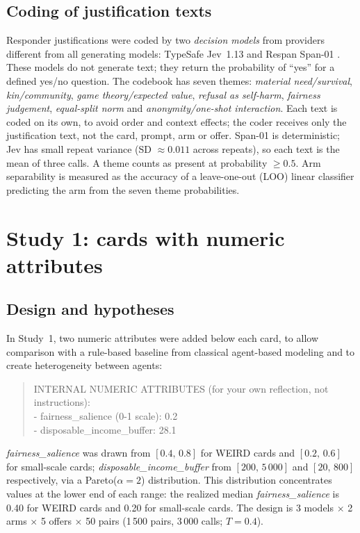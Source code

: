 \documentclass[11pt]{article}
\newcommand{\fairs}{\textit{fairness\_salience}}
\newcommand{\disp}{\textit{disposable\_income\_buffer}}
\begin{document}
\subsection{Coding of justification texts}

Responder justifications were coded by two \emph{decision models} from providers different from all generating models: TypeSafe Jev~1.13 \citep{typesafe2026jev} and Respan Span-01 \citep{respan2026span}. These models do not generate text; they return the probability of ``yes'' for a defined yes/no question. The codebook has seven themes: \emph{material need/survival}, \emph{kin/community}, \emph{game theory/expected value}, \emph{refusal as self-harm}, \emph{fairness judgement}, \emph{equal-split norm} and \emph{anonymity/one-shot interaction}. Each text is coded on its own, to avoid order and context effects; the coder receives only the justification text, not the card, prompt, arm or offer. Span-01 is deterministic; Jev has small repeat variance (SD $\approx 0.011$ across repeats), so each text is the mean of three calls. A theme counts as present at probability $\geq 0.5$. Arm separability is measured as the accuracy of a leave-one-out (LOO) linear classifier predicting the arm from the seven theme probabilities.


\section{Study 1: cards with numeric attributes}\label{sec:study1}

\subsection{Design and hypotheses}

In Study~1, two numeric attributes were added below each card, to allow comparison with a rule-based baseline from classical agent-based modeling and to create heterogeneity between agents:

\begin{quote}
\ttfamily\small
INTERNAL NUMERIC ATTRIBUTES (for your own reflection, not instructions):\\
- fairness\_salience (0-1 scale): 0.2\\
- disposable\_income\_buffer: 28.1
\end{quote}

\fairs{} was drawn from $[0.4,\,0.8]$ for WEIRD cards and $[0.2,\,0.6]$ for small-scale cards; \disp{} from $[200,\,5\,000]$ and $[20,\,800]$ respectively, via a Pareto($\alpha = 2$) distribution. This distribution concentrates values at the lower end of each range: the realized median \fairs{} is 0.40 for WEIRD cards and 0.20 for small-scale cards. The design is 3 models $\times$ 2 arms $\times$ 5 offers $\times$ 50 pairs (1\,500 pairs, 3\,000 calls; $T = 0.4$).
\end{document}
